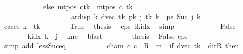 \begin{isabellebody}
\ \ \ \ \ \ \ \ \ \ \ \ else\ {\isacharparenleft}{\kern0pt}mt{\isacharunderscore}{\kern0pt}pos\ c{\isacharparenright}{\kern0pt}{\isacharparenleft}{\kern0pt}{\isacharquery}{\kern0pt}tk\ {\isacharcolon}{\kern0pt}{\isacharequal}{\kern0pt}\ mt{\isacharunderscore}{\kern0pt}pos\ c\ {\isacharquery}{\kern0pt}tk\isanewline
\ \ \ \ \ \ \ \ \ \ \ \ \ \ \ \ \ \ \ {\isacharminus}{\kern0pt}\ ar{\isacharunderscore}{\kern0pt}disp\ {\isacharquery}{\kern0pt}k\ {\isacharparenleft}{\kern0pt}dvec\ {\isacharquery}{\kern0pt}tk{\isacharparenright}{\kern0pt}\ {\isacharparenleft}{\kern0pt}{\isacharquery}{\kern0pt}pk\ j\ {\isacharquery}{\kern0pt}tk{\isacharparenright}{\kern0pt}{\isacharparenright}{\kern0pt}{\isacharparenright}{\kern0pt}\ k\ {\isacharequal}{\kern0pt}\ {\isacharquery}{\kern0pt}ps\ {\isacharparenleft}{\kern0pt}Suc\ j{\isacharparenright}{\kern0pt}\ k{\isachardoublequoteclose}\isanewline
\ \ \ \ \isamarkupfalse%
\ {\isacharparenleft}{\kern0pt}cases\ {\isachardoublequoteopen}k\ {\isacharequal}{\kern0pt}\ {\isacharquery}{\kern0pt}tk{\isachardoublequoteclose}{\isacharparenright}{\kern0pt}\isanewline
\ \ \ \ \ \ \isamarkupfalse%
\ True\ \isamarkupfalse%
\ {\isacharquery}{\kern0pt}thesis\ \isamarkupfalse%
\ c{\isacharunderscore}{\kern0pt}ps\ tkidx\ \isamarkupfalse%
\ simp\isanewline
\ \ \ \ \isamarkupfalse%
\isanewline
\ \ \ \ \ \ \isamarkupfalse%
\ False\isanewline
\ \ \ \ \ \ \isamarkupfalse%
\ {\isachardoublequoteopen}k{\isacharunderscore}{\kern0pt}idx\ k\ {\isasymnoteq}\ j{\isachardoublequoteclose}\ \isamarkupfalse%
\ kne\ \isamarkupfalse%
\ blast\isanewline
\ \ \ \ \ \ \isamarkupfalse%
\ {\isacharquery}{\kern0pt}thesis\ \isamarkupfalse%
\ False\ c{\isacharunderscore}{\kern0pt}ps\ \isamarkupfalse%
\ {\isacharparenleft}{\kern0pt}simp\ add{\isacharcolon}{\kern0pt}\ less{\isacharunderscore}{\kern0pt}Suc{\isacharunderscore}{\kern0pt}eq{\isacharparenright}{\kern0pt}\isanewline
\ \ \ \ \isamarkupfalse%
\isanewline
\ \ \isamarkupfalse%
\isanewline
\ \ \isamarkupfalse%
\ chain{\isacharcolon}{\kern0pt}\ {\isachardoublequoteopen}{\isacharparenleft}{\kern0pt}c{}{\isacharcomma}{\kern0pt}\ c{\isacharprime}{\kern0pt}{\isacharparenright}{\kern0pt}\ {\isasymin}\ {\isacharquery}{\kern0pt}R\ {\isacharcircum}{\kern0pt}{\isacharcircum}{\kern0pt}\ {\isacharparenleft}{\kern0pt}m\ {\isacharplus}{\kern0pt}\ {\isacharparenleft}{\kern0pt}if\ dvec\ {\isacharquery}{\kern0pt}tk\ {\isacharequal}{\kern0pt}\ dir{\isachardot}{\kern0pt}R\ then\ {}\isanewline

\end{isabellebody}
